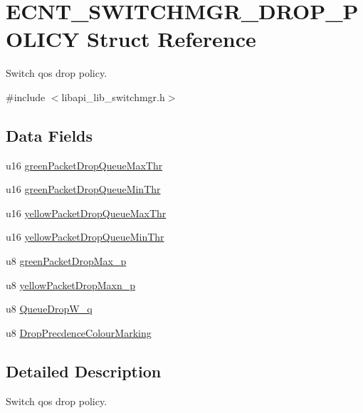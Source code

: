\hypertarget{structECNT__SWITCHMGR__DROP__POLICY}{}\section{E\+C\+N\+T\+\_\+\+S\+W\+I\+T\+C\+H\+M\+G\+R\+\_\+\+D\+R\+O\+P\+\_\+\+P\+O\+L\+I\+CY Struct Reference}
\label{structECNT__SWITCHMGR__DROP__POLICY}


Switch qos drop policy.  




{\ttfamily \#include $<$libapi\+\_\+lib\+\_\+switchmgr.\+h$>$}

\subsection*{Data Fields}
\begin{DoxyCompactItemize}
\item 
u16 \hyperlink{structECNT__SWITCHMGR__DROP__POLICY_a04c223d17a650f490f22132befd01694}{green\+Packet\+Drop\+Queue\+Max\+Thr}
\item 
u16 \hyperlink{structECNT__SWITCHMGR__DROP__POLICY_a1f88b40a1c44a0ac788d120ac4d733f9}{green\+Packet\+Drop\+Queue\+Min\+Thr}
\item 
u16 \hyperlink{structECNT__SWITCHMGR__DROP__POLICY_ac6ea96a287c7f5c0eeccf7c1d634660c}{yellow\+Packet\+Drop\+Queue\+Max\+Thr}
\item 
u16 \hyperlink{structECNT__SWITCHMGR__DROP__POLICY_a9585240845a6b39dc49329d1ebdb1fe6}{yellow\+Packet\+Drop\+Queue\+Min\+Thr}
\item 
u8 \hyperlink{structECNT__SWITCHMGR__DROP__POLICY_a4f265675707e6e8bc9a6c953bf909fdc}{green\+Packet\+Drop\+Max\+\_\+p}
\item 
u8 \hyperlink{structECNT__SWITCHMGR__DROP__POLICY_a9822c69b9003dab57472f49de43db1c0}{yellow\+Packet\+Drop\+Maxn\+\_\+p}
\item 
u8 \hyperlink{structECNT__SWITCHMGR__DROP__POLICY_a2f76030e42cbd4b687c20b4c446f8f70}{Queue\+Drop\+W\+\_\+q}
\item 
u8 \hyperlink{structECNT__SWITCHMGR__DROP__POLICY_a8268f9dd74cbfcb0d39f8ece8ad82cb3}{Drop\+Precdence\+Colour\+Marking}
\end{DoxyCompactItemize}


\subsection{Detailed Description}
Switch qos drop policy. 

